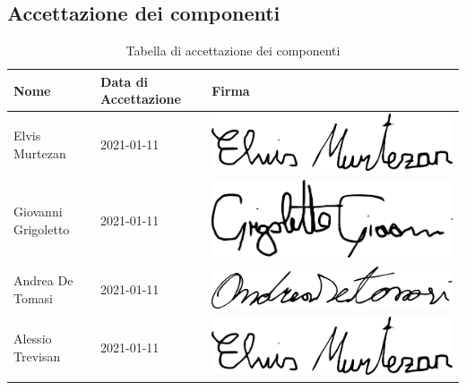 \subsection{Accettazione dei componenti}
{
	\renewcommand{\arraystretch}{2}
	\begin{longtable}{ C{5cm} C{4cm} C{5cm} }
		\caption{Tabella di accettazione dei componenti}\\
		\rowcolor{\primaryColor}
		\textcolor{\secondaryColor}{\textbf{Nome}} & \textcolor{\secondaryColor}{\textbf{Data di Accettazione}} & \textcolor{\secondaryColor}{\textbf{Firma}}\\	\endhead
		{Elvis Murtezan} & 2021-01-11 & \includegraphics[scale=0.20]{./src/Organigramma/immagini/firme/Elvis.png}\\
		{Giovanni Grigoletto} & 2021-01-11 & \includegraphics[scale=0.20]{./src/Organigramma/immagini/firme/giovanni.png}\\
		{Andrea De Tomasi} & 2021-01-11 & \includegraphics[scale=0.20]{./src/Organigramma/immagini/firme/andrea.png}\\
		{Alessio Trevisan} & 2021-01-11 & \includegraphics[scale=0.20]{./src/Organigramma/immagini/firme/Elvis.png}\\

\end{longtable}}
